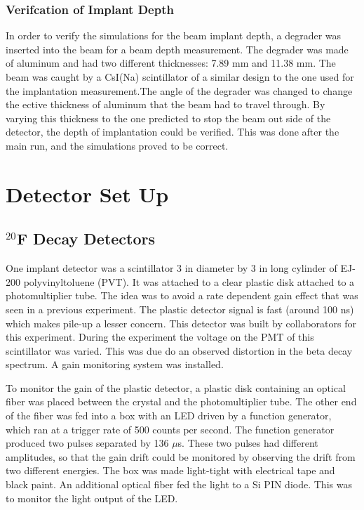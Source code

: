 \subsubsection{Verifcation of Implant Depth}

In order to verify the simulations for the beam implant depth, a degrader was inserted into the beam for a beam depth measurement.
The degrader was made of aluminum and had two different thicknesses: 7.89 mm and 11.38 mm. 
The beam was caught by a CsI(Na) scintillator of a similar design to the one used for the implantation measurement.The angle of the degrader was changed to change the ective thickness of aluminum that the beam
had to travel through. By varying this thickness to the one predicted to stop the beam out side of the detector, the depth of implantation could be verified. 
This was done after the main run, and the simulations proved to be correct.

\section{Detector Set Up}

\subsection{$^{20}$F Decay Detectors}
One implant detector was a scintillator 3 in diameter by 3 in long cylinder of EJ-200 polyvinyltoluene (PVT).
It was attached to a clear plastic disk attached to a photomultiplier tube.
The idea was to avoid a rate dependent gain effect that was seen in a previous experiment.
The plastic detector signal is fast (around 100 ns) which makes pile-up a lesser concern.
This detector was built by collaborators for this experiment.
During the experiment the voltage on the PMT of this scintillator was varied.
This was due do an observed distortion in the beta decay spectrum.
A gain monitoring system was installed.

To monitor the gain of the plastic detector, a plastic disk containing an optical fiber was placed between the crystal and the photomultiplier tube. 
The other end of the fiber was fed into a box with an LED driven by a function generator, which ran at a trigger rate of 500 counts per second. 
The function generator produced two pulses separated by 136 $\mu$s.
These two pulses had different amplitudes, so that the gain drift could be monitored by observing the drift from two different energies.
The box was made light-tight with electrical tape and black paint.
An additional optical fiber fed the light to a Si PIN diode.
This was to monitor the light output of the LED.

